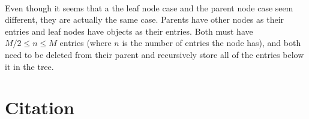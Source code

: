 \documentclass{article}
\begin{document}
\paragraph{}
Even though it seems that a the leaf node case and the parent node case seem different, they are actually the same case. Parents have
other nodes as their entries and leaf nodes have objects as their entries. Both must have $M/2 \le n \le M$ entries (where $n$ is the number
of entries the node has), and both need to be deleted from their parent and recursively store all of the entries below it in the tree.

\section{Citation}


\end{document}
